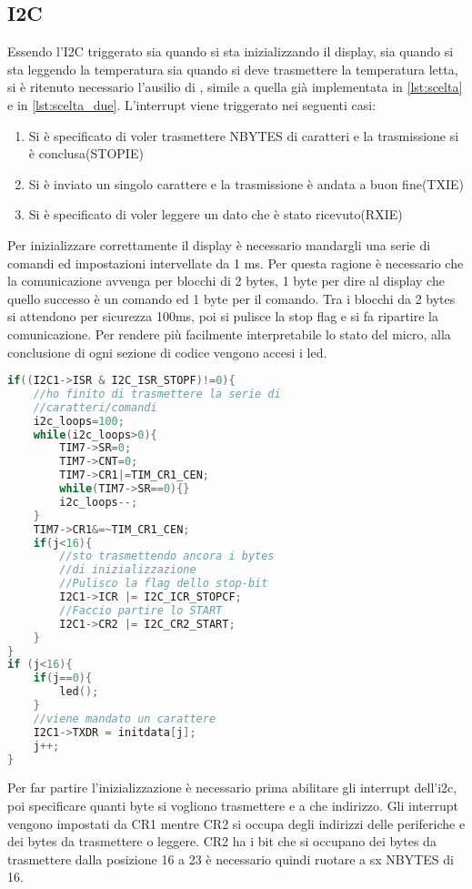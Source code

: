 \documentclass[main.tex]{subfiles}
\begin{document}
\subsection{I2C}

Essendo l'I2C triggerato sia quando si sta inizializzando il display, sia quando si sta leggendo la temperatura sia quando si deve trasmettere la temperatura letta, si è ritenuto necessario l'ausilio di , simile a quella già implementata in \ref{lst:scelta} e in \ref{lst:scelta_due}.
L'interrupt viene triggerato nei seguenti casi:\begin{enumerate}
    \item Si è specificato di voler trasmettere NBYTES di caratteri e la trasmissione si è conclusa(STOPIE)
    \item Si è inviato un singolo carattere e la trasmissione è andata a buon fine(TXIE)
    \item Si è specificato di voler leggere un dato che è stato ricevuto(RXIE)
\end{enumerate}
Per inizializzare correttamente il display è necessario mandargli una serie di comandi ed impostazioni intervellate da 1 ms. Per questa ragione è necessario che la comunicazione avvenga per blocchi di 2 bytes, 1 byte per dire al display che quello successo è un comando ed 1 byte per il comando. Tra i blocchi da 2 bytes si attendono per sicurezza 100ms, poi si pulisce la stop flag e si fa ripartire la comunicazione. 
Per rendere più facilmente interpretabile lo stato del micro, alla conclusione di ogni sezione di codice vengono accesi i led.
\begin{lstlisting}[language=C, caption=Gestione Interrupt I2C per inizializzazione Display]
if((I2C1->ISR & I2C_ISR_STOPF)!=0){
    //ho finito di trasmettere la serie di 
    //caratteri/comandi
	i2c_loops=100;
	while(i2c_loops>0){
		TIM7->SR=0;
		TIM7->CNT=0;
		TIM7->CR1|=TIM_CR1_CEN;
		while(TIM7->SR==0){}
		i2c_loops--;
	}
	TIM7->CR1&=~TIM_CR1_CEN;
	if(j<16){
	    //sto trasmettendo ancora i bytes 
	    //di inizializzazione
	    //Pulisco la flag dello stop-bit
		I2C1->ICR |= I2C_ICR_STOPCF;
		//Faccio partire lo START
		I2C1->CR2 |= I2C_CR2_START; 
	}
}
if (j<16){
	if(j==0){
		led();
	}
	//viene mandato un carattere
	I2C1->TXDR = initdata[j];
	j++; 
}
\end{lstlisting}
Per far partire l'inizializzazione è necessario prima abilitare gli interrupt dell'i2c, poi specificare quanti byte si vogliono trasmettere e a che indirizzo. 
Gli interrupt vengono impostati da CR1 mentre CR2 si occupa degli indirizzi delle periferiche e dei bytes da trasmettere o leggere. CR2 ha i bit che si occupano dei bytes da trasmettere dalla posizione 16 a 23 è necessario quindi ruotare a sx NBYTES di 16. 
\end{document}
